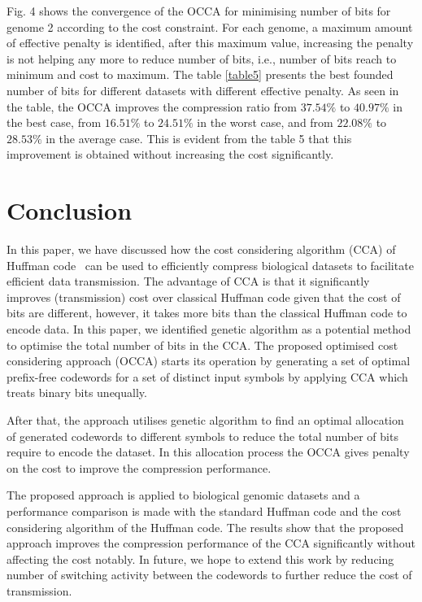 \documentclass[twocolumn,12pt,a4paper]{article}
\begin{document}
Fig. 4 shows the convergence of the OCCA for
minimising number of bits for genome 2 according to the cost constraint. For each genome, a maximum amount of effective penalty is identified, after this maximum value, increasing the penalty is not helping any more to reduce number of bits, i.e., number of bits reach to minimum and cost to maximum.  The table \ref{table5} presents the best founded number of bits for different datasets with different effective penalty. As seen in the table, the OCCA improves the compression ratio from $37.54\%$ to $40.97\%$ in the best case, from $16.51\%$ to $24.51\%$ in the worst case, and from $22.08\%$ to $28.53\%$ in the average case. This is evident from the table 5 that this improvement is obtained without increasing the cost significantly.    %





\section{Conclusion}
\label{sec5}
In this paper, we have discussed how the cost considering  algorithm (CCA) of Huffman code~\citep{Kab14} can be used to efficiently compress  biological datasets to facilitate efficient data transmission. The advantage of CCA is that it significantly improves (transmission) cost over classical Huffman code given that the cost of bits are different, however, it takes more bits than the classical Huffman code to encode data. In this paper, we identified genetic algorithm as a potential method to optimise the total number of bits in the CCA. The proposed optimised cost considering approach (OCCA) starts its operation by generating a set of optimal prefix-free codewords for a set of distinct input symbols by applying CCA which treats binary bits unequally. 

 After that, the approach utilises genetic algorithm to find an optimal allocation of generated codewords to different symbols to reduce the total number of bits require to encode the dataset. In this allocation process the OCCA gives penalty on the cost to improve the compression performance.
 
The proposed approach is applied to biological genomic datasets and a performance comparison is made with the standard Huffman code and the cost considering algorithm of the Huffman code. The results show that the proposed approach improves the compression performance of the CCA significantly without affecting the cost notably. In future, we hope to extend this work by reducing number of switching activity between the codewords to further reduce the cost of transmission.



\end{document}
